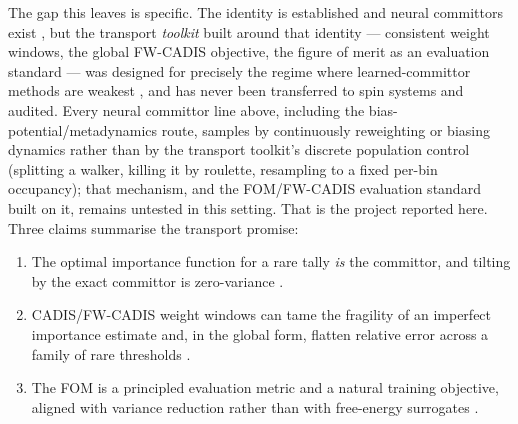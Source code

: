 \documentclass[a4paper,fleqn]{cas-sc}
\begin{document}
The gap this leaves is specific. The identity is established \cite{doob1984, chetrite2015}
and neural committors exist \cite{li2019, khoo2019, kim2026, trizio2025}, but the transport
\emph{toolkit} built around that identity --- consistent weight windows, the global
FW-CADIS objective, the figure of merit as an evaluation standard --- was designed for
precisely the regime where learned-committor methods are weakest \cite{wagner1998,
	wagnerfw2014}, and has never been transferred to spin systems and audited. Every neural
committor line above, including the bias-potential/metadynamics route, samples by
continuously reweighting or biasing dynamics rather than by the transport toolkit's
discrete population control (splitting a walker, killing it by roulette, resampling to a
fixed per-bin occupancy); that mechanism, and the FOM/FW-CADIS evaluation standard built
on it, remains untested in this setting. That is the
project reported here. Three claims summarise the transport promise:
\begin{enumerate}[itemsep=2pt]
	\item The optimal importance function for a rare tally \emph{is} the committor, and
	tilting by the exact committor is zero-variance \cite{doob1984, chetrite2015}.
	\item CADIS/FW-CADIS weight windows can tame the fragility of an imperfect importance
	estimate and, in the global form, flatten relative error across a family of rare
	thresholds \cite{wagner1998, wagnerfw2014}.
	\item The FOM is a principled evaluation metric and a natural training objective,
	aligned with variance reduction rather than with free-energy surrogates
	\cite{spanier1969, wanglandau2001}.
\end{enumerate}
\end{document}
